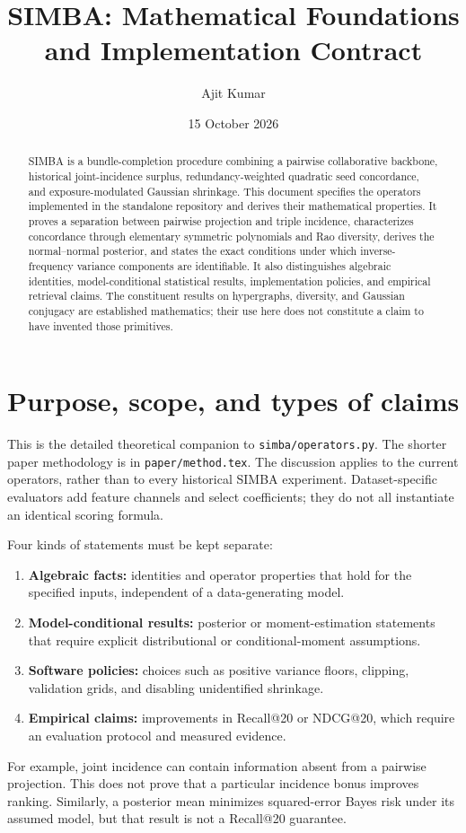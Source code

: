 \documentclass[11pt,a4paper]{article}
\title{SIMBA: Mathematical Foundations\\and Implementation Contract}
\author{Ajit Kumar}
\date{15 October 2026}
\theoremstyle{remark}
\newcommand{\code}[1]{\texttt{\small #1}}
\begin{document}
\maketitle
\begin{abstract}
SIMBA is a bundle-completion procedure combining a pairwise collaborative
backbone, historical joint-incidence surplus, redundancy-weighted quadratic
seed concordance, and exposure-modulated Gaussian shrinkage. This document
specifies the operators implemented in the standalone repository and derives
their mathematical properties. It proves a separation between pairwise
projection and triple incidence, characterizes concordance through elementary
symmetric polynomials and Rao diversity, derives the normal--normal posterior,
and states the exact conditions under which inverse-frequency variance
components are identifiable. It also distinguishes algebraic identities,
model-conditional statistical results, implementation policies, and empirical
retrieval claims. The constituent results on hypergraphs, diversity, and
Gaussian conjugacy are established mathematics; their use here does not
constitute a claim to have invented those primitives.
\end{abstract}
\tableofcontents
\newpage

\section{Purpose, scope, and types of claims}
This is the detailed theoretical companion to \code{simba/operators.py}.
The shorter paper methodology is in \code{paper/method.tex}. The discussion
applies to the current operators, rather than to every historical SIMBA
experiment. Dataset-specific evaluators add feature channels and select
coefficients; they do not all instantiate an identical scoring formula.

Four kinds of statements must be kept separate:
\begin{enumerate}
  \item \textbf{Algebraic facts:} identities and operator properties that
  hold for the specified inputs, independent of a data-generating model.
  \item \textbf{Model-conditional results:} posterior or moment-estimation
  statements that require explicit distributional or conditional-moment
  assumptions.
  \item \textbf{Software policies:} choices such as positive variance floors,
  clipping, validation grids, and disabling unidentified shrinkage.
  \item \textbf{Empirical claims:} improvements in Recall@20 or NDCG@20,
  which require an evaluation protocol and measured evidence.
\end{enumerate}
For example, joint incidence can contain information absent from a pairwise
projection. This does not prove that a particular incidence bonus improves
ranking. Similarly, a posterior mean minimizes squared-error Bayes risk under
its assumed model, but that result is not a Recall@20 guarantee.
\end{document}
